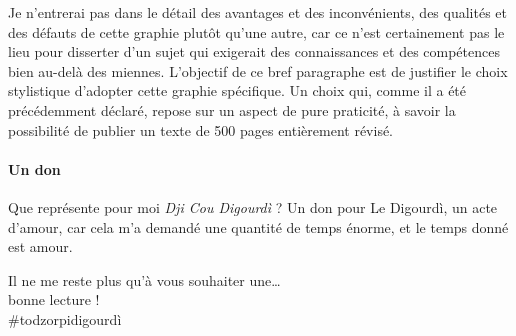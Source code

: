 Je n'entrerai pas dans le détail des avantages et des inconvénients, des qualités et des défauts de cette graphie plutôt qu'une autre, car ce n'est certainement pas le lieu pour disserter d'un sujet qui exigerait des connaissances et des compétences bien au-delà des miennes. L'objectif de ce bref paragraphe est de justifier le choix stylistique d'adopter cette graphie spécifique. Un choix qui, comme il a été précédemment déclaré, repose sur un aspect de pure praticité, à savoir la possibilité de publier un texte de 500 pages entièrement révisé.

\paragraph*{Un don}
Que représente pour moi \textit{Dji Cou Digourdì} ? Un don pour Le Digourdì, un acte d'amour, car cela m'a demandé une quantité de temps énorme, et le temps donné est amour.
\begin{center}
Il ne me reste plus qu'à vous souhaiter une\ldots\\\vfill bonne lecture !\\\vfill\#todzorpidigourdì
\end{center}


